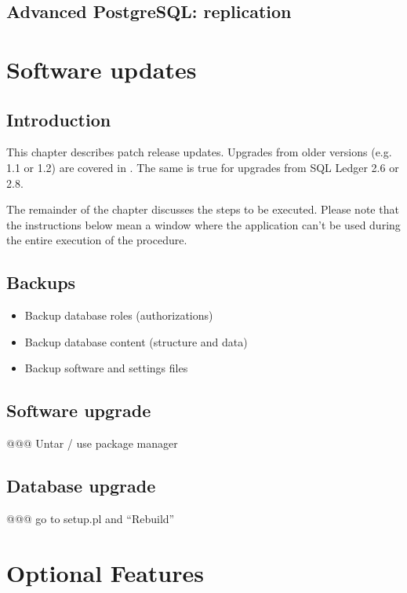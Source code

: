 \section{Advanced PostgreSQL: replication}

\chapter{Software updates}

\section{Introduction}

This chapter describes patch release updates. Upgrades from older versions (e.g. 1.1 or 1.2)
are covered in . The same is true for upgrades from SQL Ledger 2.6 or 2.8.

The remainder of the chapter discusses the steps to be executed. Please note that the instructions
below mean a window where the application can't be used during the entire execution of the procedure.

\section{Backups}

\begin{itemize}
\item Backup database roles (authorizations)
\item Backup database content (structure and data)
\item Backup software and settings files
\end{itemize}



\section{Software upgrade}

@@@ Untar / use package manager

\section{Database upgrade}

@@@ go to setup.pl and ``Rebuild''

\chapter{Optional Features}

